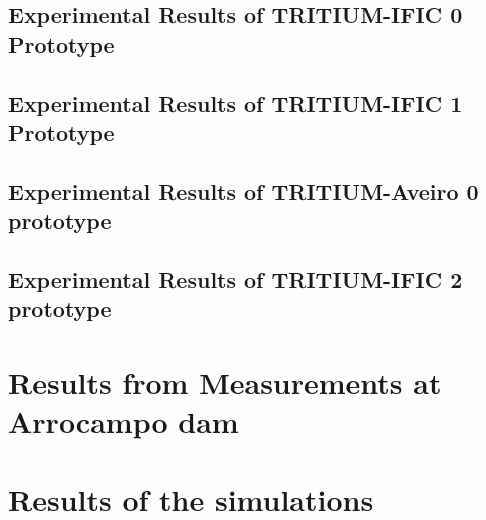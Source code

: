 \documentclass[12pt,a4paper]{book}
\begin{document}
		\subsection[Experimental Results of TRITIUM-IFIC 0]{Experimental Results of TRITIUM-IFIC 0 Prototype}\label{subsec:ResultsTritiumIFIC0}
		
		
		\subsection[Experimental Results of TRITIUM-IFIC 1]{Experimental Results of TRITIUM-IFIC 1 Prototype}\label{subsec:ResultsTritiumIFIC1}
		
		
		\subsection[Experimental Results of TRITIUM-Aveiro 0]{Experimental Results of TRITIUM-Aveiro 0 prototype}\label{subsec:ResultsTritiumAveiro}
		
		
		\subsection[Experimental Results of TRITIUM-IFIC 1]{Experimental Results of TRITIUM-IFIC 2 prototype}\label{subsec:ResultsTritiumIFIC2}
		
		\newpage
		
	\section[Experimental Results in Arrocampo dam]{Results from Measurements at Arrocampo dam}\label{sec:ResultsArrocampo}
	
	\newpage
	
	\section{Results of the simulations}\label{sec:ResultsSimulations}
	
	\newpage		
\end{document}
